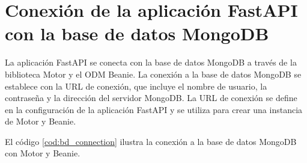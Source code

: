 \chapter{Conexión de la aplicación FastAPI con la base de datos MongoDB}
\label{AppendixD}

La aplicación FastAPI se conecta con la base de datos MongoDB a través de la
biblioteca Motor y el ODM Beanie. La conexión a la base de datos MongoDB se
establece con la URL de conexión, que incluye el nombre de usuario, la
contraseña y la dirección del servidor MongoDB. La URL de conexión se define en
la configuración de la aplicación FastAPI y se utiliza para crear una instancia
de Motor y Beanie.

El código \ref{cod:bd_connection} ilustra la conexión a la base de datos
MongoDB con Motor y Beanie.


